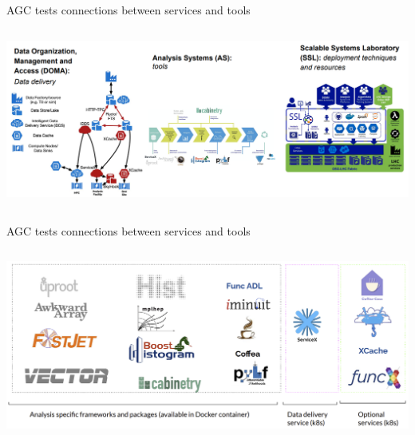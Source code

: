 \documentclass[aspectratio=169]{beamer}
\begin{document}
\begin{frame}{AGC tests connections between services and tools}
\vspace{0.35 cm}
\begin{columns}
\includegraphics[width=\linewidth]{PLOTS/agc-intersection-of-services-and-tools.png}
\end{columns}
\end{frame}

\begin{frame}{AGC tests connections between services and tools}
\vspace{0.35 cm}
\begin{columns}
\includegraphics[width=\linewidth]{PLOTS/agc-intersection-of-services-and-tools-2.png}
\end{columns}
\end{frame}




\begin{frame}{}
\end{frame}


\begin{frame}{}
\end{frame}
\end{document}
